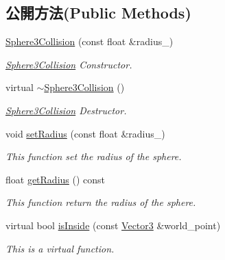 \subsection*{公開方法(Public Methods)}
\begin{DoxyCompactItemize}
\item 
\hyperlink{class_magnum_1_1_sphere3_collision_a9da6a13091c103cb520e9c10c0fc1360}{Sphere3\+Collision} (const float \&radius\+\_)
\begin{DoxyCompactList}\small\item\em \hyperlink{class_magnum_1_1_sphere3_collision}{Sphere3\+Collision} Constructor. \end{DoxyCompactList}\item 
virtual \hyperlink{class_magnum_1_1_sphere3_collision_a274417dc6054f6c9509fb8efeba88cdc}{$\sim$\+Sphere3\+Collision} ()
\begin{DoxyCompactList}\small\item\em \hyperlink{class_magnum_1_1_sphere3_collision}{Sphere3\+Collision} Destructor. \end{DoxyCompactList}\item 
void \hyperlink{class_magnum_1_1_sphere3_collision_abd9f5a829661c4d4aac40da32bb95cf2}{set\+Radius} (const float \&radius\+\_\+)
\begin{DoxyCompactList}\small\item\em This function set the radius of the sphere. \end{DoxyCompactList}\item 
float \hyperlink{class_magnum_1_1_sphere3_collision_a92f0a4804bb7cd7d0d7a343e69c6d11d}{get\+Radius} () const 
\begin{DoxyCompactList}\small\item\em This function return the radius of the sphere. \end{DoxyCompactList}\item 
virtual bool \hyperlink{class_magnum_1_1_sphere3_collision_a54686b42bb5841ad0ad882f748b7dfad}{is\+Inside} (const \hyperlink{class_magnum_1_1_vector3}{Vector3} \&world\+\_\+point)
\begin{DoxyCompactList}\small\item\em This is a virtual function. \end{DoxyCompactList}\end{DoxyCompactItemize}
